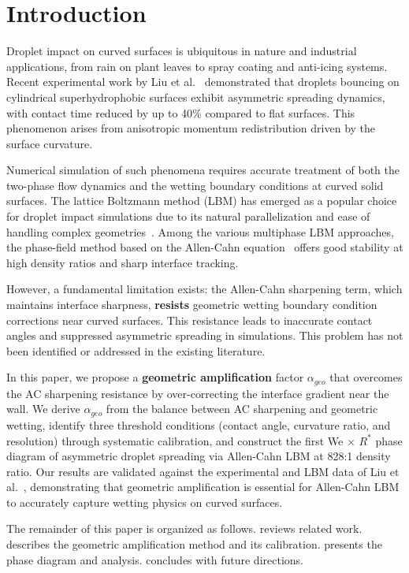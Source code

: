 \section{Introduction}\label{sec:intro}

Droplet impact on curved surfaces is ubiquitous in nature and industrial applications, from rain on plant leaves to spray coating and anti-icing systems. Recent experimental work by Liu et al.~\cite{liu2015symmetry} demonstrated that droplets bouncing on cylindrical superhydrophobic surfaces exhibit asymmetric spreading dynamics, with contact time reduced by up to 40\% compared to flat surfaces. This phenomenon arises from anisotropic momentum redistribution driven by the surface curvature.

Numerical simulation of such phenomena requires accurate treatment of both the two-phase flow dynamics and the wetting boundary conditions at curved solid surfaces. The lattice Boltzmann method (LBM) has emerged as a popular choice for droplet impact simulations due to its natural parallelization and ease of handling complex geometries~\cite{shan1993lattice, fakhari2017improved}. Among the various multiphase LBM approaches, the phase-field method based on the Allen-Cahn equation~\cite{lee2005lattice} offers good stability at high density ratios and sharp interface tracking.

However, a fundamental limitation exists: the Allen-Cahn sharpening term, which maintains interface sharpness, \textbf{resists} geometric wetting boundary condition corrections near curved surfaces. This resistance leads to inaccurate contact angles and suppressed asymmetric spreading in simulations. This problem has not been identified or addressed in the existing literature.

In this paper, we propose a \textbf{geometric amplification} factor $\alpha_{geo}$ that overcomes the AC sharpening resistance by over-correcting the interface gradient near the wall. We derive $\alpha_{geo}$ from the balance between AC sharpening and geometric wetting, identify three threshold conditions (contact angle, curvature ratio, and resolution) through systematic calibration, and construct the first We $\times$ $R^*$ phase diagram of asymmetric droplet spreading via Allen-Cahn LBM at 828:1 density ratio. Our results are validated against the experimental and LBM data of Liu et al.~\cite{liu2015symmetry}, demonstrating that geometric amplification is essential for Allen-Cahn LBM to accurately capture wetting physics on curved surfaces.

The remainder of this paper is organized as follows.  reviews related work.  describes the geometric amplification method and its calibration.  presents the phase diagram and analysis.  concludes with future directions.
